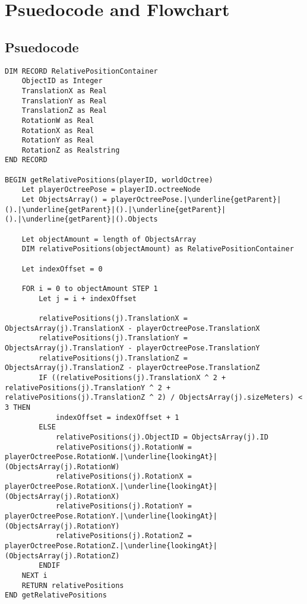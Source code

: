 \documentclass[12pt, DIV=calc]{scrartcl}
\begin{document}
\clearpage
\section{Psuedocode and Flowchart}
\subsection{Psuedocode}
\begin{verbatim}
DIM RECORD RelativePositionContainer
    ObjectID as Integer
    TranslationX as Real
    TranslationY as Real
    TranslationZ as Real
    RotationW as Real
    RotationX as Real
    RotationY as Real
    RotationZ as Realstring
END RECORD

BEGIN getRelativePositions(playerID, worldOctree)
    Let playerOctreePose = playerID.octreeNode
    Let ObjectsArray() = playerOctreePose.|\underline{getParent}|().|\underline{getParent}|().|\underline{getParent}|().|\underline{getParent}|().Objects

    Let objectAmount = length of ObjectsArray
    DIM relativePositions(objectAmount) as RelativePositionContainer

    Let indexOffset = 0

    FOR i = 0 to objectAmount STEP 1
        Let j = i + indexOffset

        relativePositions(j).TranslationX = ObjectsArray(j).TranslationX - playerOctreePose.TranslationX
        relativePositions(j).TranslationY = ObjectsArray(j).TranslationY - playerOctreePose.TranslationY
        relativePositions(j).TranslationZ = ObjectsArray(j).TranslationZ - playerOctreePose.TranslationZ
        IF ((relativePositions(j).TranslationX ^ 2 + relativePositions(j).TranslationY ^ 2 + relativePositions(j).TranslationZ ^ 2) / ObjectsArray(j).sizeMeters) < 3 THEN
            indexOffset = indexOffset + 1
        ELSE
            relativePositions(j).ObjectID = ObjectsArray(j).ID
            relativePositions(j).RotationW = playerOctreePose.RotationW.|\underline{lookingAt}|(ObjectsArray(j).RotationW)   
            relativePositions(j).RotationX = playerOctreePose.RotationX.|\underline{lookingAt}|(ObjectsArray(j).RotationX) 
            relativePositions(j).RotationY = playerOctreePose.RotationY.|\underline{lookingAt}|(ObjectsArray(j).RotationY) 
            relativePositions(j).RotationZ = playerOctreePose.RotationZ.|\underline{lookingAt}|(ObjectsArray(j).RotationZ) 
        ENDIF        
    NEXT i
    RETURN relativePositions
END getRelativePositions
\end{verbatim}
\end{document}
